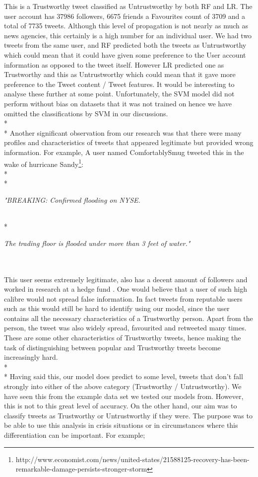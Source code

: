 This is a Trustworthy tweet classified as Untrustworthy by both RF and LR. The user account has 37986 followers, 6675 friends a Favourites count of 3709 and a total of 7735 tweets. Although this level of propagation is not nearly as much as news agencies, this certainly is a high number for an individual user. We had two tweets from the same user, and RF predicted both the tweets as Untrustworthy which could mean that it could have given some preference to the User account information as opposed to the tweet itself. However LR predicted one as Trustworthy and this as Untrustworthy which could mean that it gave more preference to the Tweet content / Tweet features. It would be interesting to analyse these further at some point. Unfortunately, the SVM model did not perform without bias on datasets that it was not trained on hence we have omitted the classifications by SVM in our discussions.\\*\\*
 \noindent
Another significant observation from our research was that there were many profiles and characteristics of tweets that appeared legitimate but provided wrong information. For example, A user named ComfortablySmug tweeted this in the wake of hurricane Sandy\footnote{http://www.economist.com/news/united-states/21588125-recovery-has-been-remarkable-damage-persists-stronger-storm}:\\*\\*
\centerline{\textit{"BREAKING: Confirmed flooding on NYSE.}} \\* \centerline{\textit{The trading floor is flooded under more than 3 feet of water."}}\leavevmode \\\\
This user seems extremely legitimate, also has a decent amount of followers and worked in research at a hedge fund \cite{37}. One would believe that a user of such high calibre would not spread false information. In fact tweets from reputable users such as this would still be hard to identify using our model, since the user contains all the necessary characteristics of a Trustworthy person. Apart from the person, the tweet was also widely spread, favourited and retweeted many times. These are some other characteristics of Trustworthy tweets, hence making the task of distinguishing between popular and Trustworthy tweets become increasingly hard. \\*\\*
Having said this, our model does predict to some level, tweets that don't fall strongly into either of the above category (Trustworthy / Untrustworthy). We have seen this from the example data set we tested our models from. However, this is not to this great level of accuracy. On the other hand, our aim was to classify tweets as Trustworthy or Untrustworthy if they were. The purpose was to be able to use this analysis in crisis situations or in circumstances where this differentiation can be important. For example; 
